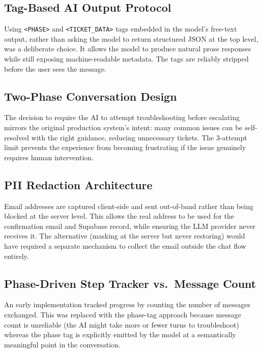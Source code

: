 \documentclass[12pt, a4paper]{article}
\newcommand{\inlinecode}[1]{%
  \colorbox{inlinecode!20}{\texttt{\small #1}}%
}
\begin{document}
\subsection{Tag-Based AI Output Protocol}

Using \inlinecode{<PHASE>} and \inlinecode{<TICKET\_DATA>} tags embedded in the model's
free-text output, rather than asking the model to return structured JSON at the top level,
was a deliberate choice. It allows the model to produce natural prose responses while
still exposing machine-readable metadata. The tags are reliably stripped before the user
sees the message.

\subsection{Two-Phase Conversation Design}

The decision to require the AI to attempt troubleshooting before escalating mirrors the
original production system's intent: many common issues can be self-resolved with the
right guidance, reducing unnecessary tickets. The 3-attempt limit prevents the experience
from becoming frustrating if the issue genuinely requires human intervention.

\subsection{PII Redaction Architecture}

Email addresses are captured client-side and sent out-of-band rather than being blocked
at the server level. This allows the real address to be used for the confirmation email
and Supabase record, while ensuring the LLM provider never receives it. The alternative
(masking at the server but never restoring) would have required a separate mechanism to
collect the email outside the chat flow entirely.

\subsection{Phase-Driven Step Tracker vs.\ Message Count}

An early implementation tracked progress by counting the number of messages exchanged.
This was replaced with the phase-tag approach because message count is unreliable (the
AI might take more or fewer turns to troubleshoot) whereas the phase tag is explicitly
emitted by the model at a semantically meaningful point in the conversation.
\end{document}

